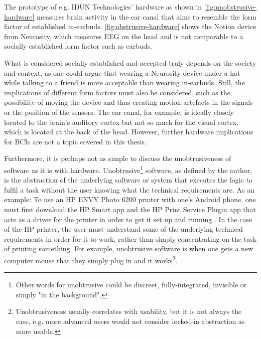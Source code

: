 The prototype of e.g. IDUN Technologies' hardware as shown in \autoref{fig:unobstrusive-hardware} measures brain activity in the ear canal that aims to resemble the form factor of established in-earbuds. \autoref{fig:obstrusive-hardware} shows the Notion device from Neurosity, which measures EEG on the head and is not comparable to a socially established form factor such as earbuds.

What is considered socially established and accepted truly depends on the society and context, as one could argue that wearing a Neurosity device under a hat while talking to a friend is more acceptable than wearing in-earbuds. Still, the implications of different form factors must also be considered, such as the possibility of moving the device and thus creating motion artefacts in the signals or the position of the sensors. The ear canal, for example, is ideally closely located to the brain's auditory cortex but not so much for the visual cortex, which is located at the back of the head. However, further hardware implications for BCIs are not a topic covered in this thesis.

Furthermore, it is perhaps not as simple to discuss the unobtrusiveness of software as it is with hardware. Unobtrusive\footnote{Other words for unobtrusive could be discreet, fully-integrated, invisible or simply "in the background".} software, as defined by the author, is the abstraction of the underlying software or system that executes the logic to fulfil a task without the user knowing what the technical requirements are. As an example: To use an HP ENVY Photo 6200 printer with one's Android phone, one must first download the HP Smart app and the HP Print Service Plugin app that acts as a driver for the printer in order to get it set up and running \citep{hp_hp_nodate}. In the case of the HP printer, the user must understand some of the underlying technical requirements in order for it to work, rather than simply concentrating on the task of printing something. For example, unobtrusive software is when one gets a new computer mouse that they simply plug in and it works\footnote{Unobtrusiveness usually correlates with usability, but it is not always the case, e.g. more advanced users would not consider locked-in abstraction as more usable.}.

